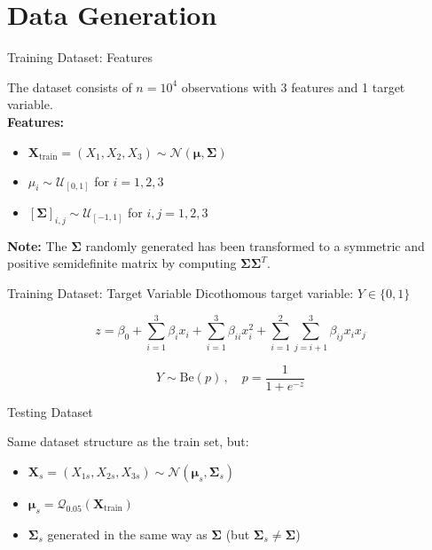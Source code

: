 \section{Data Generation}

\begin{frame}{Training Dataset: Features}

    The dataset consists of $n = 10^4$ observations with 3 features and 1 target variable.\\\vspace{0.3cm}
    \pause\textbf{Features:}
    \begin{itemize}
        \item $ \boldsymbol{X}_{\text{train}} = (X_1, X_2, X_3) \sim \mathcal{N}(\boldsymbol{\mu}, \boldsymbol{\Sigma}) $
        \item $ \mu_i \sim \mathcal{U}_{[0,1]} $ for $ i = 1, 2, 3 $
        \item $ [\boldsymbol{\Sigma}]_{i,j} \sim \mathcal{U}_{[-1,1]} $ for $ i, j = 1, 2, 3 $
    \end{itemize}
    \vspace{0.3cm}
    \textbf{Note:} The $\boldsymbol{\Sigma}$ randomly generated has been transformed to a symmetric and positive semidefinite matrix by computing $\boldsymbol{\Sigma}\boldsymbol{\Sigma}^T$. 

\end{frame}

\begin{frame}{Training Dataset: Target Variable}
    Dicothomous target variable: $Y\in\{0,1\}$

    $$
        z = \beta_0 + \sum_{i=1}^3 \beta_i x_i + \sum_{i=1}^3 \beta_{ii} x_i^2 + \sum_{i=1}^{2} \sum_{j=i+1}^3 \beta_{ij} x_i x_j
    $$

    $$
        Y \sim \text{Be}(p)\,,\quad p = \frac{1}{1 + e^{-z}}
    $$
\end{frame}

\begin{frame}{Testing Dataset}

    Same dataset structure as the train set, but:
    \begin{itemize}
        \item $ \boldsymbol{X}_s = (X_{1s}, X_{2s}, X_{3s}) \sim \mathcal{N}(\boldsymbol{\mu}_s, \boldsymbol{\Sigma}_s) $
        \item $ \boldsymbol{\mu}_s = \mathcal{Q}_{0.05}(\boldsymbol{X}_{\text{train}})$
        \item $\boldsymbol{\Sigma}_s$ generated in the same way as $\boldsymbol{\Sigma}$ (but $\boldsymbol{\Sigma}_s\neq\boldsymbol{\Sigma}$)
    \end{itemize}
    
\end{frame}
